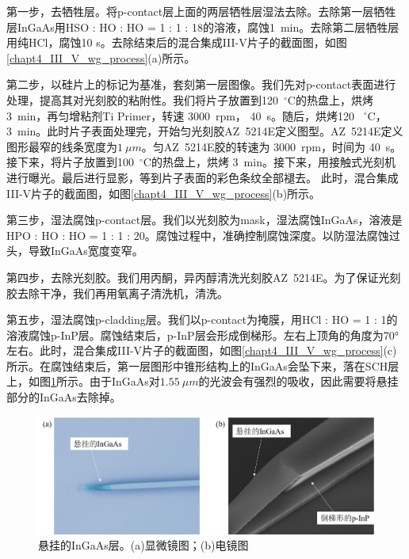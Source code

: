 第一步，去牺牲层。将p-contact层上面的两层牺牲层湿法去除。去除第一层牺牲层InGaAs用HSO : HO : HO = 1 : 1 : 18的溶液，腐蚀1~min。去除第二层牺牲层用纯HCl，腐蚀10 s。去除结束后的混合集成III-V片子的截面图，如图\ref{chapt4_III_V_wg_process}(a)所示。

第二步，以硅片上的标记为基准，套刻第一层图像。我们先对p-contact表面进行处理，提高其对光刻胶的粘附性。我们将片子放置到120~$^{\circ}$C的热盘上，烘烤3~min，再匀增粘剂Ti Primer，转速 3000~rpm， 40~s。随后，烘烤120 ~$^{\circ}$C， 3~min。此时片子表面处理完，开始匀光刻胶AZ~5214E定义图型。AZ~5214E定义图形最窄的线条宽度为$1~\mu m$。匀AZ~5214E胶的转速为 3000~rpm，时间为 40~s。接下来，将片子放置到100~$^{\circ}$C的热盘上，烘烤 3~min。接下来，用接触式光刻机进行曝光。最后进行显影，等到片子表面的彩色条纹全部褪去。 此时，混合集成III-V片子的截面图，如图\ref{chapt4_III_V_wg_process}(b)所示。

第三步，湿法腐蚀p-contact层。我们以光刻胶为mask，湿法腐蚀InGaAs，溶液是HPO : HO : HO = 1 : 1 : 20。腐蚀过程中，准确控制腐蚀深度。以防湿法腐蚀过头，导致InGaAs宽度变窄。

第四步，去除光刻胶。我们用丙酮，异丙醇清洗光刻胶AZ~5214E。为了保证光刻胶去除干净，我们再用氧离子清洗机，清洗。

第五步，湿法腐蚀p-cladding层。我们以p-contact为掩膜，用HCl : HO = 1 : 1的溶液腐蚀p-InP层。腐蚀结束后，p-InP层会形成倒梯形。左右上顶角的角度为70°左右。此时，混合集成III-V片子的截面图，如图\ref{chapt4_III_V_wg_process}(c)所示。在腐蚀结束后，第一层图形中锥形结构上的InGaAs会坠下来，落在SCH层上，如图\ref{chapt4_III_V_suspeneded_InGaAs}所示。由于InGaAs对$1.55~\mu m$的光波会有强烈的吸收，因此需要将悬挂部分的InGaAs去除掉。
\begin{figure}[!h]
	\centering
	\includegraphics[width=14cm]{./Pictures/chapt4_III_V_suspeneded_InGaAs.jpg}
	\caption{悬挂的InGaAs层。(a)显微镜图；(b)电镜图}
	\label{chapt4_III_V_suspeneded_InGaAs}
\end{figure}

